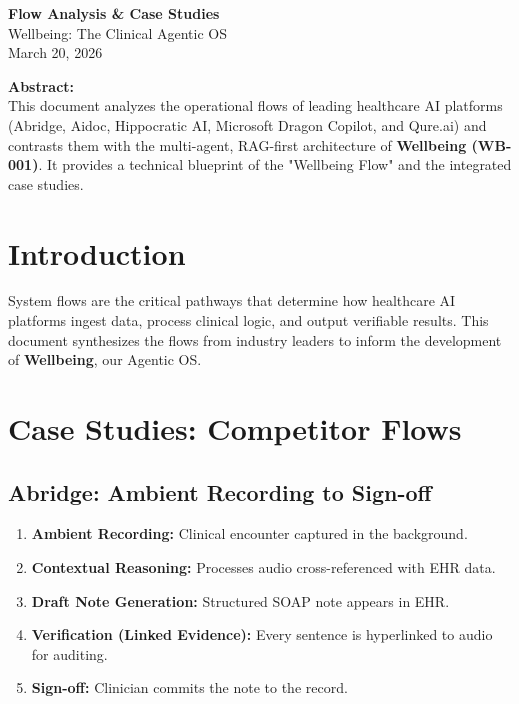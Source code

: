 \documentclass[12pt,a4paper]{article}
\begin{document}
\begin{titlepage}
    \centering\vspace*{1.5cm}
    {\Huge\bfseries\color{primaryblue} Flow Analysis \& Case Studies}\\[0.5cm]
    {\Large\color{accentgreen} Wellbeing: The Clinical Agentic OS}\\[1cm]
    {\large March 20, 2026}\\[2cm]

    \begin{mdframed}[backgroundcolor=lightgray, linecolor=primaryblue, linewidth=1.5pt, roundcorner=5pt]
        \centering\vspace{0.4cm}
        \textbf{Abstract:}\\[0.2cm]
        This document analyzes the operational flows of leading healthcare AI platforms (Abridge, Aidoc, Hippocratic AI, Microsoft Dragon Copilot, and Qure.ai) and contrasts them with the multi-agent, RAG-first architecture of \textbf{Wellbeing (WB-001)}. It provides a technical blueprint of the "Wellbeing Flow" and the integrated case studies.
        \vspace{0.4cm}
    \end{mdframed}
\end{titlepage}

\newpage
\tableofcontents
\newpage

\section{Introduction}
System flows are the critical pathways that determine how healthcare AI platforms ingest data, process clinical logic, and output verifiable results. This document synthesizes the flows from industry leaders to inform the development of \textbf{Wellbeing}, our Agentic OS.

\section{Case Studies: Competitor Flows}

\subsection{Abridge: Ambient Recording to Sign-off}
\begin{enumerate}[noitemsep]
    \item \textbf{Ambient Recording:} Clinical encounter captured in the background.
    \item \textbf{Contextual Reasoning:} Processes audio cross-referenced with EHR data.
    \item \textbf{Draft Note Generation:} Structured SOAP note appears in EHR.
    \item \textbf{Verification (Linked Evidence):} Every sentence is hyperlinked to audio for auditing.
    \item \textbf{Sign-off:} Clinician commits the note to the record.
\end{enumerate}
\end{document}

